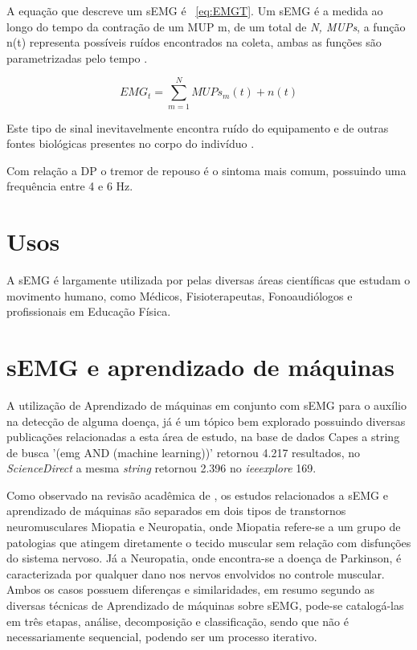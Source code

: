 A equação que descreve um sEMG é ~\ref{eq:EMGT}. Um sEMG é a medida ao longo do tempo da contração de um MUP m, de um total de \textit{N, MUPs}, a função n(t) representa possíveis ruídos encontrados na coleta, ambas as funções são parametrizadas pelo tempo \cite{yousefi2014characterizing}.

\begin{equation} \label{eq:EMGT}
    EMG_{t} =\sum_{m=1}^{N} MUPs_{m}(t)+n(t)
\end{equation}

Este tipo de sinal inevitavelmente encontra ruído do equipamento e de outras fontes biológicas presentes no corpo do indivíduo \cite{yousefi2014characterizing}.

Com relação a DP o tremor de repouso é o sintoma mais comum, possuindo uma frequência entre 4 e 6 Hz.
\cite{jankovic2008parkinson}

\section{Usos}
A sEMG é largamente utilizada por pelas diversas áreas científicas que estudam o movimento humano, como Médicos, Fisioterapeutas, Fonoaudiólogos e profissionais em Educação Física\cite{nascimento2012surface}.

\section{sEMG e aprendizado de máquinas}
A utilização de Aprendizado de máquinas em conjunto com sEMG para o auxílio na detecção de alguma doença, já é um tópico bem explorado possuindo diversas publicações relacionadas a esta área de estudo, na base de dados Capes a string de busca '(emg AND (machine learning))' retornou 4.217 resultados, no \textit{ScienceDirect} a mesma \textit{string} retornou 2.396 no \textit{ieeexplore} 169.

Como observado na revisão acadêmica de \cite{yousefi2014characterizing}, os estudos relacionados a sEMG e aprendizado de máquinas são separados em  dois tipos de transtornos neuromusculares Miopatia e Neuropatia, onde Miopatia refere-se a um grupo de patologias que atingem diretamente o tecido muscular sem relação com disfunções do sistema nervoso. Já a Neuropatia, onde encontra-se a doença de Parkinson, é caracterizada por qualquer dano nos nervos envolvidos no controle muscular. Ambos os casos possuem diferenças e similaridades, em resumo segundo \cite{yousefi2014characterizing} as diversas técnicas de Aprendizado de máquinas sobre sEMG, pode-se catalogá-las em três etapas, análise, decomposição e classificação, sendo que não é necessariamente sequencial, podendo ser um processo iterativo.

